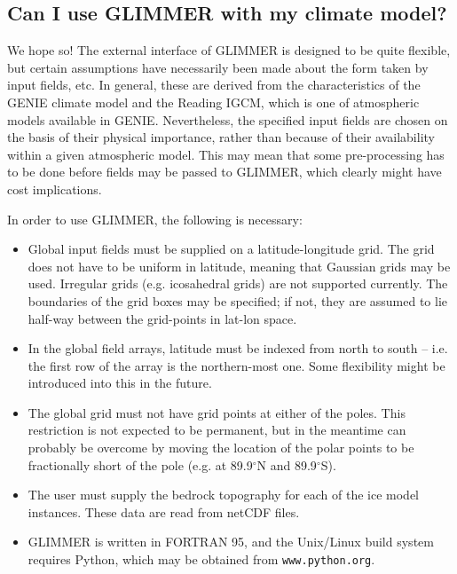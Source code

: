 \subsection{Can I use GLIMMER with my climate model?}

We hope so! The external interface of GLIMMER is designed to be quite
flexible, but certain assumptions have necessarily been made about the form
taken by input fields, etc. In general, these are derived from the
characteristics of the GENIE climate model and the Reading IGCM, which is one
of atmospheric models available in GENIE. Nevertheless, the specified input
fields are chosen on the basis of their physical importance, rather than
because of their availability within a given atmospheric model. This may mean
that some pre-processing has to be done before fields may be passed to
GLIMMER, which clearly might have cost implications.

In order to use GLIMMER, the following is necessary:

\begin{itemize}
\item Global input fields must be supplied on a latitude-longitude
  grid. The grid does not have to be uniform in latitude, meaning that
  Gaussian grids may be used. Irregular grids (e.g. icosahedral grids) are not
  supported currently. The boundaries of the grid boxes may be specified; if
  not, they are assumed to lie half-way between the grid-points in lat-lon space.
\item In the global field arrays, latitude must be indexed from north to south
  -- i.e. the first row of the array is the northern-most one. Some
  flexibility might be introduced into this in the future.
\item The global grid must not have grid points at either of the poles. This
  restriction is not expected to be permanent, but in the meantime
  can probably be overcome by moving the location of the polar points to be
  fractionally short of the pole (e.g. at 89.9$^{\circ}$N and 89.9$^{\circ}$S).
\item The user must supply the bedrock topography for each of the ice model
  instances. These data are read from netCDF files.
\item GLIMMER is written in FORTRAN 95, and the Unix/Linux build system
  requires Python, which may be obtained from \texttt{www.python.org}. 
\end{itemize}
